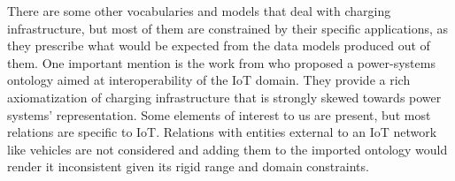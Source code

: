 There are some other vocabularies and models that deal with charging
infrastructure, but most of them are constrained by their specific
applications, as they prescribe what would be expected from the data models
produced out of them. One important mention is the work from
\cite{MaximeLefrancois.2017} who proposed a power-systems ontology aimed at
interoperability of the IoT domain. They provide a rich axiomatization of
charging infrastructure that is strongly skewed towards power systems'
representation. Some elements of interest to us are present, but most relations
are specific to IoT. Relations with entities external to an IoT network like
vehicles are not considered and adding them to the imported ontology would
render it inconsistent given its rigid range and domain constraints. 